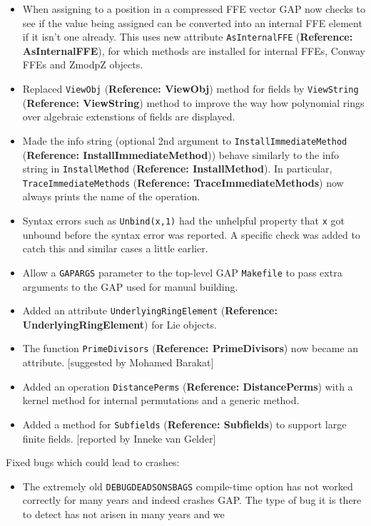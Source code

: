 \documentclass[a4paper,11pt]{report}
\begin{document}
{{{\begin{itemize}
lists. 
\item  When assigning to a position in a compressed FFE vector \textsf{GAP} now checks to see if the value being assigned can be converted into an
internal FFE element if it isn't one already. This uses new attribute \texttt{AsInternalFFE} (\textbf{Reference: AsInternalFFE}), for which methods are installed for internal FFEs, Conway FFEs and ZmodpZ
objects. 
\item  Replaced \texttt{ViewObj} (\textbf{Reference: ViewObj}) method for fields by \texttt{ViewString} (\textbf{Reference: ViewString}) method to improve the way how polynomial rings over algebraic extenstions of
fields are displayed. 
\item  Made the info string (optional 2nd argument to \texttt{InstallImmediateMethod} (\textbf{Reference: InstallImmediateMethod})) behave similarly to the info string in \texttt{InstallMethod} (\textbf{Reference: InstallMethod}). In particular, \texttt{TraceImmediateMethods} (\textbf{Reference: TraceImmediateMethods}) now always prints the name of the operation. 
\item  Syntax errors such as \texttt{Unbind(x,1)} had the unhelpful property that \texttt{x} got unbound before the syntax error was reported. A specific check was added
to catch this and similar cases a little earlier. 
\item  Allow a \texttt{GAPARGS} parameter to the top-level \textsf{GAP} \texttt{Makefile} to pass extra arguments to the \textsf{GAP} used for manual building. 
\item  Added an attribute \texttt{UnderlyingRingElement} (\textbf{Reference: UnderlyingRingElement}) for Lie objects. 
\item  The function \texttt{PrimeDivisors} (\textbf{Reference: PrimeDivisors}) now became an attribute. [suggested by Mohamed Barakat] 
\item  Added an operation \texttt{DistancePerms} (\textbf{Reference: DistancePerms}) with a kernel method for internal permutations and a generic method. 
\item  Added a method for \texttt{Subfields} (\textbf{Reference: Subfields}) to support large finite fields. [reported by Inneke van Gelder] 
\end{itemize}
 Fixed bugs which could lead to crashes: 
\begin{itemize}
\item  The extremely old \texttt{DEBUG{\textunderscore}DEADSONS{\textunderscore}BAGS} compile-time option has not worked correctly for many years and indeed crashes \textsf{GAP}. The type of bug it is there to detect has not arisen in many years and we

\end{itemize}}}}
\end{document}
